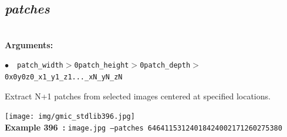 \documentclass[a4paper,10.5pt,twoside]{book}
\def\comma{\discretionary{,}{}{,}}
\newcommand{\Cb}[1]{\textcolor{cb}{#1}}
\begin{document}
\subsection{\emph{patches} }\vspace*{-0.7em}
~\\\textbf{\Cb{Arguments: }}\begin{flushleft}
{\small \Cb{\hspace*{0.5cm}$\bullet$~~\texttt{patch\_width$>$0{\comma}patch\_height$>$0{\comma}patch\_depth$>$0{\comma}x0{\comma}y0{\comma}z0{\comma}\_x1{\comma}\_y1{\comma}\-\_z1{\comma}...{\comma}\_xN{\comma}\_yN{\comma}\_zN}}}\end{flushleft}
Extract N+1 patches from selected images{\comma} centered at specified locations.
\begin{center}\texttt{[image: img/gmic\_stdlib396.jpg]}\\
{\footnotesize \textbf{Example 396~:} \texttt{image.jpg --patches 64{\comma}64{\comma}1{\comma}153{\comma}124{\comma}0{\comma}184{\comma}240{\comma}0{\comma}217{\comma}126{\comma}0{\comma}275{\comma}38{\comma}0}}
\end{center}
\end{document}
